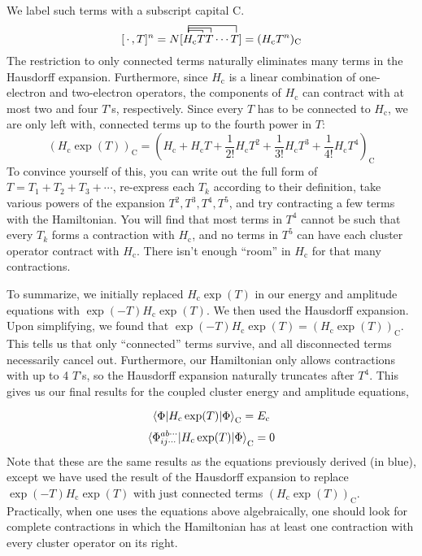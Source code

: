 \documentclass{article}
\newcommand{\fctr}{\contraction}
\newcommand{\Ec}{E_{\mathrm{c}}}
\newcommand{\Hc}{H_{\mathrm{c}}}
\begin{document}
We label such terms with a subscript capital C.
\[
  [\,\cdot\,,T]^n
=
N[
  \fctr[1.5ex]{}{H}{{}_\mathrm{c}TT\cdots}{T}
  \fctr[1.0ex]{}{H}{{}_\mathrm{c}T}{T}
  \fctr[0.5ex]{}{H}{{}_\mathrm{c}}{T}
  H_\mathrm{c} TT\cdots T
]
=
  (H_\mathrm{c} T^n)_\mathrm{C}
\]
The restriction to only connected terms naturally eliminates many terms in the Hausdorff expansion. 
Furthermore, since $\Hc$ is a linear combination of one-electron and two-electron operators, 
    the components of $\Hc$ can contract with at most two and four $T$'s, respectively. 
Since every $T$ has to be connected to $\Hc$, we are only left with, 
connected terms up to the fourth power in $T$:
\[ (\Hc \exp(T))_{\mathrm{C}} = (\Hc + \Hc T + \frac{1}{2!} \Hc T^2 +
  \frac{1}{3!} \Hc T^3 +  \frac{1}{4!} \Hc T^4)_{\mathrm{C}} \]
To convince yourself of this, you can write out the full form 
of $T = T_1 + T_2 + T_3 + \cdots $, re-express each $T_k$ according to their
definition, take various powers of the expansion $T^2, T^3, T^4, T^5$, 
and try contracting a few terms with the Hamiltonian. 
You will find that most terms in $T^4$ cannot be such that every $T_k$ forms a contraction
with $\Hc$, and no terms in $T^5$ can have each cluster operator contract with $\Hc$.
There isn't enough ``room'' in $\Hc$ for that many contractions.

To summarize, we initially replaced $\Hc \exp(T)$ in our energy and amplitude equations
with $ \exp(-T) \Hc \exp(T)$. We then used the Hausdorff expansion.
Upon simplifying, we found that $\exp(-T) \Hc \exp(T) = (\Hc \exp(T))_{\mathrm{C}}$.
This tells us that only ``connected'' terms survive, 
    and all disconnected terms necessarily cancel out. 
Furthermore, our Hamiltonian only allows contractions with up to 4 $T$'s,
so the Hausdorff expansion naturally truncates after $T^4$.
This gives us our final results for the coupled cluster energy and amplitude equations, 

\[\braket{\Phi |\Hc \exp(T) | \Phi }_\mathrm{C} = \Ec \]
\[\braket{ \Phi_{i j \cdots }^{a b \cdots} |\Hc \exp(T) | \Phi}_\mathrm{C} 
   =  0  \]
Note that these are the same results as the equations previously derived (in blue),
except we have used the result of the Hausdorff expansion to replace 
 $\exp(-T) \Hc \exp(T)$ with just connected terms $(\Hc \exp(T))_{\mathrm{C}}$.
Practically, when one uses the equations above algebraically, 
one should look for complete contractions in which the Hamiltonian
has at least one contraction with every cluster operator on its right.
\end{document}
